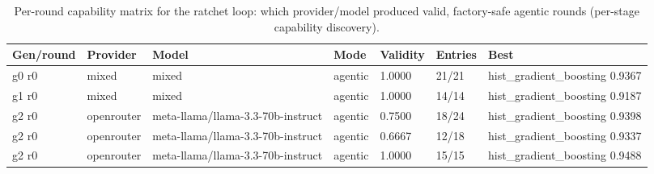 \begin{table}[H]
\centering\small
\caption{Per-round capability matrix for the ratchet loop: which provider/model produced valid, factory-safe agentic rounds (per-stage capability discovery).}
\label{tab:ratchet-rounds-ratchet-ledger-kidney}
\begin{tabular}{lllllll}
\toprule
Gen/round & Provider & Model & Mode & Validity & Entries & Best \\
\midrule
g0 r0 & mixed & mixed & agentic & 1.0000 & 21/21 & hist\_gradient\_boosting 0.9367 \\
g1 r0 & mixed & mixed & agentic & 1.0000 & 14/14 & hist\_gradient\_boosting 0.9187 \\
g2 r0 & openrouter & meta-llama/llama-3.3-70b-instruct & agentic & 0.7500 & 18/24 & hist\_gradient\_boosting 0.9398 \\
g2 r0 & openrouter & meta-llama/llama-3.3-70b-instruct & agentic & 0.6667 & 12/18 & hist\_gradient\_boosting 0.9337 \\
g2 r0 & openrouter & meta-llama/llama-3.3-70b-instruct & agentic & 1.0000 & 15/15 & hist\_gradient\_boosting 0.9488 \\
\bottomrule
\end{tabular}
\end{table}
